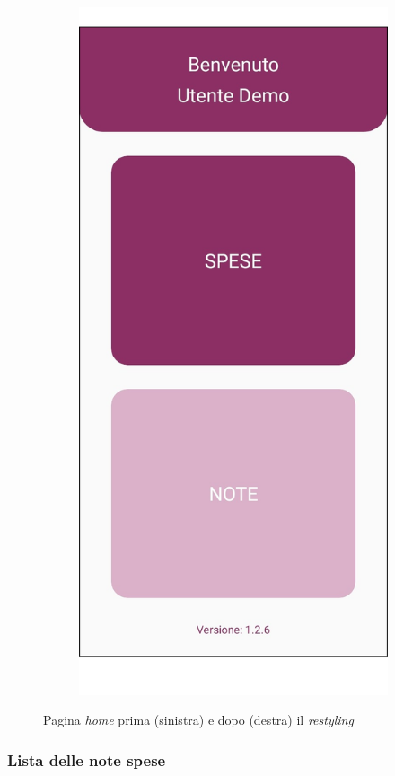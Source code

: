 \begin{figure}[H]
\begin{subfigure}{.5\textwidth}
        \includegraphics[width=.7\columnwidth]{images/screenshot/new/home.png}\vspace{2mm}
    \end{subfigure}
    \caption{Pagina \textit{home} prima (sinistra) e dopo (destra) il \textit{restyling}}
\end{figure}


\subsubsection{Lista delle note spese}

